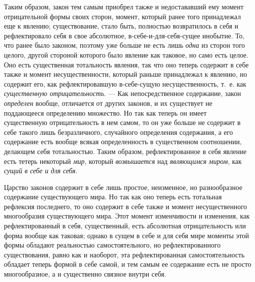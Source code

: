 Таким образом, закон тем самым приобрел также и недостававший ему момент
отрицательной формы своих сторон, момент, который ранее того принадлежал
еще к явлению; существование, стало быть, полностью возвратилось в себя и
рефлектировало себя в свое абсолютное, в-себе-и-для-себя-сущее инобытие.
То, что ранее было законом, поэтому уже больше не есть лишь
{\em одна} из сторон того целого, другой стороной
которого было явление как таковое, но само есть целое. Оно есть
существенная тотальность явления, так что оно теперь содержит в себе также
и момент несущественности, который раньше принадлежал к явлению, но
содержит его, как рефлектировавшую в-себе-сущую несущественность, т.~е. как
{\em существенную отрицательность}. — Как
непосредственное содержание, закон {\em определен}
вообще, отличается от других законов, и их существует не поддающееся
определению множество. Но так как теперь он имеет существенную
отрицательность в нем самом, то он уже больше не содержит в себе такого
лишь безразличного, случайного определения содержания, а его содержание
есть вообще всякая определенность в существенном соотношении, делающем себя
тотальностью. Таким образом, рефлектированное в себя явление есть тетерь
некоторый {\em мир}, который
{\em возвышается} над
{\em являющимся миром}, как
{\em сущий в себе и для себя}.

Царство законов содержит в себе лишь простое, неизменное, но разнообразное
содержание существующего мира. Но так как оно теперь есть тотальная
рефлексия последнего, то оно содержит в себе также и момент несущественного
многообразия существующего мира. Этот момент изменчивости и изменения, как
рефлектированный в себя, существенный, есть абсолютная отрицательность или
форма вообще как таковая; однако в сущем в себе и для себя мире моменты
этой формы обладают реальностью самостоятельного, но рефлектированного
существования, равно как и наоборот, эта рефлектированная самостоятельность
обладает теперь формой в себе самой, и тем самым ее содержание есть не
просто многообразное, а и существенно связное внутри себя.

